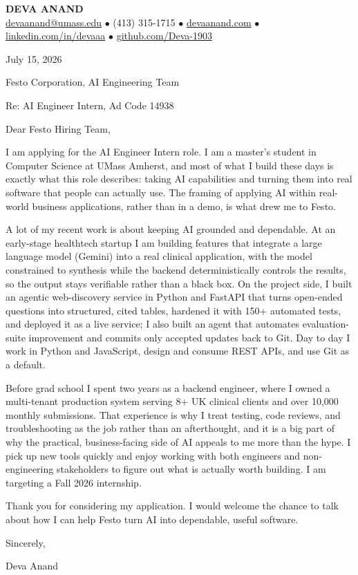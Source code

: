\documentclass[letterpaper,11pt]{article}
\begin{document}
\begin{center}
    {\fontsize{18}{20}\selectfont\bfseries DEVA ANAND}\\ \vspace{3pt}
    {\small
    \href{mailto:devaanand@umass.edu}{devaanand@umass.edu}
    \enspace$\bullet$\enspace
    (413) 315-1715
    \enspace$\bullet$\enspace
    \href{https://devaanand.com}{devaanand.com}
    \enspace$\bullet$\enspace
    \href{https://linkedin.com/in/devaaa/}{linkedin.com/in/devaaa}
    \enspace$\bullet$\enspace
    \href{https://github.com/Deva-1903}{github.com/Deva-1903}}
\end{center}
\vspace{6pt}

July 15, 2026

\vspace{2pt}

Festo Corporation, AI Engineering Team

Re: AI Engineer Intern, Ad Code 14938

\vspace{6pt}

Dear Festo Hiring Team,

I am applying for the AI Engineer Intern role. I am a master's student in Computer Science at UMass Amherst, and most of what I build these days is exactly what this role describes: taking AI capabilities and turning them into real software that people can actually use. The framing of applying AI within real-world business applications, rather than in a demo, is what drew me to Festo.

A lot of my recent work is about keeping AI grounded and dependable. At an early-stage healthtech startup I am building features that integrate a large language model (Gemini) into a real clinical application, with the model constrained to synthesis while the backend deterministically controls the results, so the output stays verifiable rather than a black box. On the project side, I built an agentic web-discovery service in Python and FastAPI that turns open-ended questions into structured, cited tables, hardened it with 150+ automated tests, and deployed it as a live service; I also built an agent that automates evaluation-suite improvement and commits only accepted updates back to Git. Day to day I work in Python and JavaScript, design and consume REST APIs, and use Git as a default.

Before grad school I spent two years as a backend engineer, where I owned a multi-tenant production system serving 8+ UK clinical clients and over 10,000 monthly submissions. That experience is why I treat testing, code reviews, and troubleshooting as the job rather than an afterthought, and it is a big part of why the practical, business-facing side of AI appeals to me more than the hype. I pick up new tools quickly and enjoy working with both engineers and non-engineering stakeholders to figure out what is actually worth building. I am targeting a Fall 2026 internship.

Thank you for considering my application. I would welcome the chance to talk about how I can help Festo turn AI into dependable, useful software.

\vspace{4pt}

Sincerely,

\vspace{2pt}

Deva Anand
\end{document}
